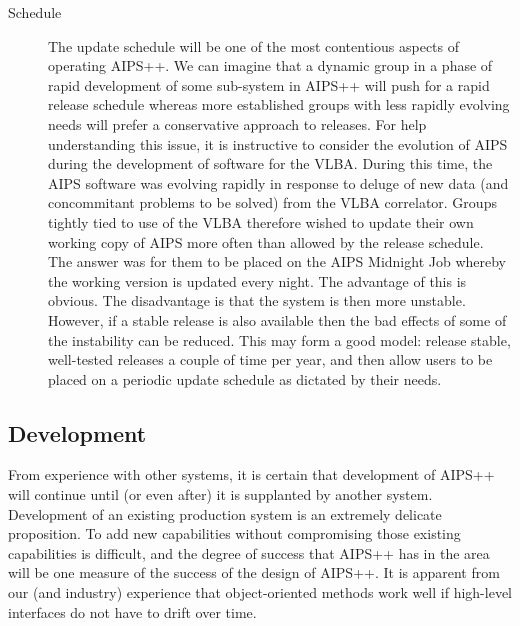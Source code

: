 \begin{description}
\item[Schedule] The update schedule will be one of the most contentious
aspects of operating AIPS++. We can imagine that a dynamic group in a
phase of rapid development of some sub-system in AIPS++ will push for
a rapid release schedule whereas more established groups with less
rapidly evolving needs will prefer a conservative approach to
releases. For help understanding this issue, it is instructive to
consider the evolution of AIPS during the development of software for
the VLBA. During this time, the AIPS software was evolving rapidly in
response to deluge of new data (and concommitant problems to be
solved) from the VLBA correlator. Groups tightly tied to use of the
VLBA therefore wished to update their own working copy of AIPS more
often than allowed by the release schedule. The answer was for them to
be placed on the AIPS Midnight Job whereby the working version is
updated every night. The advantage of this is obvious. The
disadvantage is that the system is then more unstable.  However, if a
stable release is also available then the bad effects of some of the
instability can be reduced. This may form a good model: release
stable, well-tested releases a couple of time per year, and then allow
users to be placed on a periodic update schedule as dictated by their
needs.

\end{description}

\subsection{Development}

From experience with other systems, it is certain that development of
AIPS++ will continue until (or even after) it is supplanted by another
system. Development of an existing production system is an extremely
delicate proposition. To add new capabilities without compromising
those existing capabilities is difficult, and the degree of success
that AIPS++ has in the area will be one measure of the success of the
design of AIPS++. It is apparent from our (and industry) experience
that object-oriented methods work well if high-level interfaces do
not have to drift over time. 

